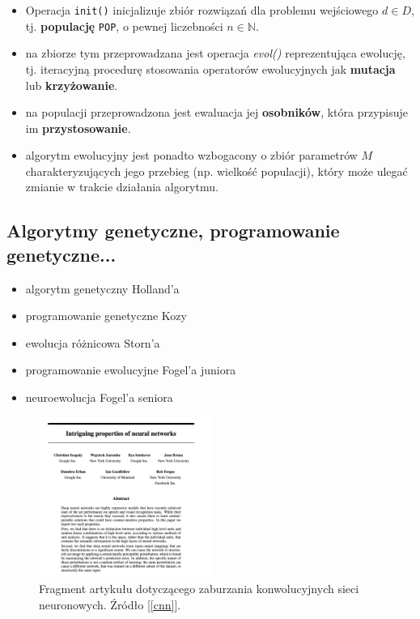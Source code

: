\documentclass[slidescentered]{beamer}
\begin{document}
\begin{frame}

\begin{itemize}
	\pause \item	Operacja \texttt{init()} inicjalizuje zbiór rozwiązań dla problemu wejściowego $d \in D$, tj. \textbf{populację} \texttt{POP}, o pewnej liczebności $n \in \mathbb{N}$. 
	\pause \item	na zbiorze tym przeprowadzana jest operacja \textit{evol()} reprezentująca ewolucję, tj. iteracyjną procedurę stosowania operatorów ewolucyjnych jak \textbf{mutacja} lub \textbf{krzyżowanie}. 
	\pause \item na populacji przeprowadzona jest ewaluacja jej \textbf{osobników}, która przypisuje im \textbf{przystosowanie}. 
	\pause \item	algorytm ewolucyjny jest ponadto wzbogacony o zbiór parametrów $M$ charakteryzujących jego przebieg (np. wielkość populacji), który może ulegać zmianie w trakcie działania algorytmu.  
	\end{itemize}
\end{frame}


\subsection{Algorytmy genetyczne, programowanie genetyczne...}

\begin{frame}
\begin{itemize}
	\pause \item algorytm genetyczny Holland'a
	\pause \item programowanie genetyczne Kozy
	\pause \item ewolucja różnicowa Storn'a
	\pause \item programowanie ewolucyjne Fogel'a juniora 
	\pause \item neuroewolucja Fogel'a seniora
\end{itemize}
\end{frame}
\begin{frame}
	\begin{figure}[H]
		\centering
		\includegraphics[width=0.5\textwidth, height=0.7\textheight]{./cnn.png}
		\caption{Fragment artykułu dotyczącego zaburzania konwolucyjnych sieci neuronowych. Źródło [\ref{cnn}].}
	\end{figure}
\end{frame}
\end{document}
